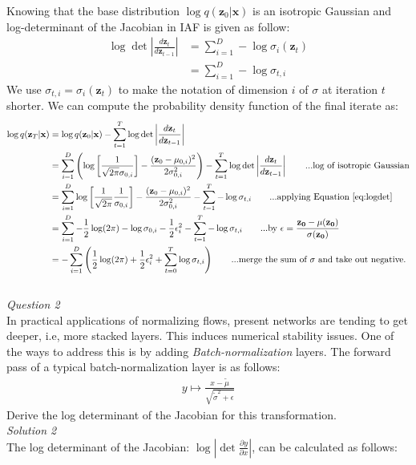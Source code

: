 \documentclass{article}
\begin{document}
Knowing that the base distribution $\log q(\mathbf{z}_0 | \mathbf{x})$ is an isotropic Gaussian and log-determinant of the Jacobian in IAF is given as follow:
\begin{align}
\log\det \left|\frac{d\mathbf{z}_t}{d\mathbf{z}_{t-1}}\right| &= \sum_{i=1}^{D} -\log \sigma_i(\mathbf{z}_{t})\\
&= \sum_{i=1}^{D} -\log \sigma_{t,i}
\label{eq:logdet}
\end{align}
We use $\sigma_{t,i} =  \sigma_i(\mathbf{z}_{t})$ to make the notation of dimension $i$ of $\sigma$ at iteration $t$ shorter. We can compute the probability density function of the final iterate as:
\begin{align*}
\log q(\mathbf{z}_T | \mathbf{x}) &= \log q(\mathbf{z}_0 | \mathbf{x}) - \sum_{t=1}^{T} \log\det \left|\frac{d\mathbf{z}_t}{d\mathbf{z}_{t-1}}\right|\\
 &= \sum_{i=1}^{D} \left(\log \left[\frac{1}{\sqrt{2\pi}\sigma_{0,i}}\right] - \frac{(\mathbf{z}_{0}-\mu_{0,i})^2}{2\sigma_{0,i}^2} \right) - \sum_{t=1}^{T} \log\det \left|\frac{d\mathbf{z}_t}{d\mathbf{z}_{t-1}}\right|		\text{\hspace{20pt}...log of isotropic Gaussian}\\
 &= \sum_{i=1}^{D}\log \left[\frac{1}{\sqrt{2\pi}}\frac{1}{\sigma_{0,i}}\right] - \frac{(\mathbf{z}_{0}-\mu_{0,i})^2}{2\sigma_{0,i}^2} - \sum_{t=1}^{T} -\log \sigma_{t,i}            \text{\hspace{20pt}...applying Equation~\ref{eq:logdet} }\\
 &= \sum_{i=1}^{D}- \frac{1}{2}\log(2\pi) - \log \sigma_{0,i} -  \frac{1}{2}  \epsilon_i^2 - \sum_{t=1}^{T} -\log \sigma_{t,i}            \text{\hspace{20pt}...by $\epsilon = \frac{\mathbf{z_0} - \mu(\mathbf{z_0})}{\sigma(\mathbf{z_0})}$}\\
 &= -\sum_{i=1}^{D} \left( \frac{1}{2}\log(2\pi) + \frac{1}{2}  \epsilon_i^2 + \sum_{t=0}^{T} \log \sigma_{t,i} \right)           \text{\hspace{20pt}...merge the sum of $\sigma$ and take out negative. }\\
\end{align*}
\\[3pt]


\noindent\emph{Question 2}
\\[3pt]
In practical applications of normalizing flows, present networks are tending to get deeper, i.e, more stacked layers. This induces numerical stability issues. One of the ways to address this is by adding \textit{Batch-normalization} layers. The forward pass of a typical batch-normalization layer is as follows:
\begin{align}
y \mapsto \frac{x - \tilde{\mu}}{\sqrt{\tilde{\sigma}^{2} + \epsilon}}
\end{align}
Derive the log determinant of the Jacobian for this transformation.
\\[10pt]
\emph{Solution 2}
\\[3pt]
The log determinant of the Jacobian: $\log\left| \det\frac{\partial y}{\partial x} \right|$, can be calculated as follows:
\end{document}
